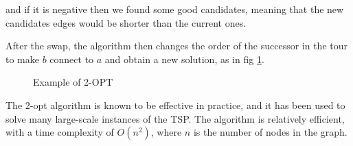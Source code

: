 and if it is negative then we found some good candidates, meaning that the new candidates edges would be shorter than the current ones.

After the swap, the algorithm then changes the order of the successor in the tour to make $b$ connect to $a$ and obtain a new solution, as in fig \ref{fig:2OPT}.

\begin{figure}[!h]
    \centering
    \caption{Example of 2-OPT} \label{fig:2OPT}
\end{figure}

The 2-opt algorithm is known to be effective in practice, and it has been used to solve many large-scale instances of the TSP. The algorithm is relatively efficient, with a time complexity of $O(n^2)$, where $n$ is the number of nodes in the graph.

